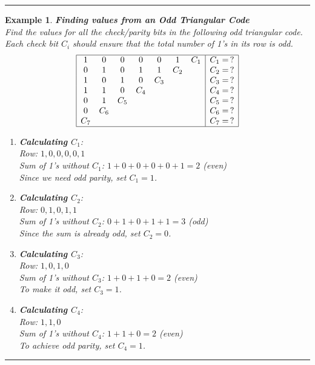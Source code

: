 \documentclass[12pt]{article}
\newtheorem{example}{Example}
\newenvironment{examp}
{\vspace{0.5cm}
 \hrule
\vspace{0.5cm}
\begin{example}}
{\hrule
\vspace{0.5cm}
\end{example}}
\begin{document}
\begin{examp}
	\textbf{Finding values from an Odd Triangular Code}\\
	Find the values for all the check/parity bits in the following odd triangular code. Each check bit \( C_i \) should ensure that the total number of 1's in its row is odd.
	\[
		\begin{array}{|ccccccc|c|}
			\hline
			1   & 0   & 0   & 0   & 0   & 1   & C_1 & C_1 = \, ? \\
			0   & 1   & 0   & 1   & 1   & C_2 &     & C_2 = \, ? \\
			1   & 0   & 1   & 0   & C_3 &     &     & C_3 = \, ? \\
			1   & 1   & 0   & C_4 &     &     &     & C_4 = \, ? \\
			0   & 1   & C_5 &     &     &     &     & C_5 = \, ? \\
			0   & C_6 &     &     &     &     &     & C_6 = \, ? \\
			C_7 &     &     &     &     &     &     & C_7 = \, ? \\
			\hline
		\end{array}
	\]
	\begin{enumerate}
		\item \textbf{Calculating \( C_1 \)}: \\
		      Row: \( 1, 0, 0, 0, 0, 1 \) \\
		      Sum of 1's without \( C_1 \): \( 1 + 0 + 0 + 0 + 0 + 1 = 2 \) (even) \\
		      Since we need odd parity, set \( C_1 = 1 \).

		\item \textbf{Calculating \( C_2 \)}: \\
		      Row: \( 0, 1, 0, 1, 1 \) \\
		      Sum of 1's without \( C_2 \): \( 0 + 1 + 0 + 1 + 1 = 3 \) (odd) \\
		      Since the sum is already odd, set \( C_2 = 0 \).

		\item \textbf{Calculating \( C_3 \)}: \\
		      Row: \( 1, 0, 1, 0 \) \\
		      Sum of 1's without \( C_3 \): \( 1 + 0 + 1 + 0 = 2 \) (even) \\
		      To make it odd, set \( C_3 = 1 \).

		\item \textbf{Calculating \( C_4 \)}: \\
		      Row: \( 1, 1, 0 \) \\
		      Sum of 1's without \( C_4 \): \( 1 + 1 + 0 = 2 \) (even) \\
		      To achieve odd parity, set \( C_4 = 1 \).


\end{enumerate}
\end{examp}
\end{document}
